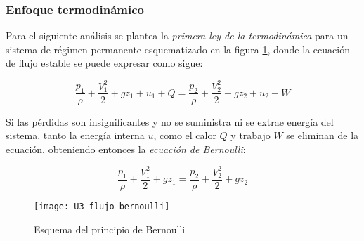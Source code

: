 \subsubsection{Enfoque termodinámico}

Para el siguiente análisis se plantea la \emph{primera ley de la termodinámica} para un sistema de régimen permanente esquematizado en la figura \ref{fig:ecuacion-de-bernoulli}, donde la ecuación de flujo estable se puede expresar como sigue:

\begin{equation*}
 \dfrac{p_1}{\rho} +	\dfrac{V_1^2}{2} + g z_1 + u_1 + Q=  \dfrac{p_2}{\rho} + \dfrac{V_2^2}{2} + g z_2 + u_2 + W
\end{equation*}


Si las pérdidas son insignificantes y no se suministra ni se extrae energía del sistema, tanto la energía interna $u$, como el calor $Q$ y trabajo $W$ se eliminan de la ecuación, obteniendo entonces la \emph{ecuación de Bernoulli}:

\begin{equation}
	\dfrac{p_1}{\rho} +	\dfrac{V_1^2}{2} + g z_1 =  \dfrac{p_2}{\rho} + \dfrac{V_2^2}{2} + g z_2
	\label{eq:bernoulli}
\end{equation}

\begin{figure}[H]
	\centering
	\texttt{[image: U3-flujo-bernoulli]}
	\caption{Esquema del principio de Bernoulli}
	\label{fig:ecuacion-de-bernoulli}
\end{figure}


